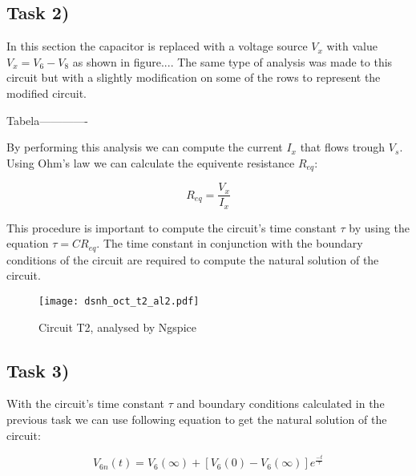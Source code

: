 \subsection{Task 2)}
\label{subsec:task2_a}

In this section the capacitor is replaced with a voltage source $V_x$ with value $V_x = V_6 - V_8$ as shown in figure.... The same type of analysis was made to this circuit but with a slightly modification on some of the rows to represent the modified circuit.

Tabela-------------


By performing this analysis we can compute the current $I_x$ that flows trough $V_s$. Using Ohm's law we can calculate the equivente resistance $R_{eq}$:

\[
R_{eq}=\frac{V_x}{I_x}
\]


This procedure is important to compute the circuit's time constant $\tau$ by using the equation $\tau = CR_{eq}$. The time constant in conjunction with the boundary conditions of the circuit are required to compute the natural solution of the circuit.


\begin{figure}[ht]
	\centering
	\texttt{[image: dsnh\_oct\_t2\_al2.pdf]}
	\caption{Circuit T2, analysed by Ngspice}
\label{fig:Dsnh_sim_t2}
\end{figure}

\subsection{Task 3)}
\label{subsec:task3_a}

With the circuit's time constant $\tau$ and boundary conditions calculated in the previous task we can use following equation to get the natural solution of the circuit:

\[
V_{6n}(t) = V_6(\infty) + [V_6(0) - V_6(\infty)]e^{\frac{-t}{\tau}}
\] 

